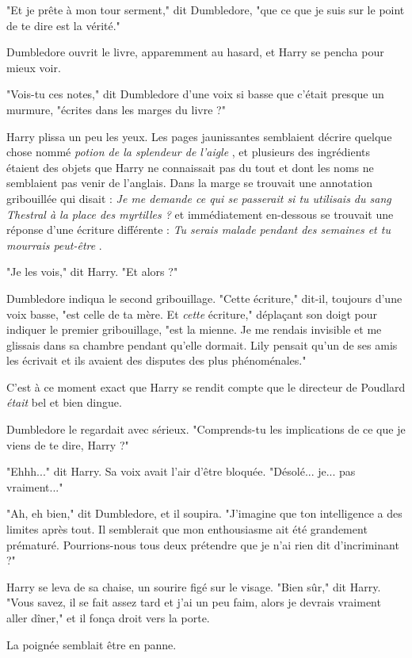 "Et je prête à mon tour serment," dit Dumbledore, "que ce que je suis sur le point de te dire est la vérité."

Dumbledore ouvrit le livre, apparemment au hasard, et Harry se pencha pour mieux voir.

"Vois-tu ces notes," dit Dumbledore d'une voix si basse que c'était presque un murmure, "écrites dans les marges du livre ?"

Harry plissa un peu les yeux. Les pages jaunissantes semblaient décrire quelque chose nommé \emph{potion de la splendeur de l'aigle} , et plusieurs des ingrédients étaient des objets que Harry ne connaissait pas du tout et dont les noms ne semblaient pas venir de l'anglais. Dans la marge se trouvait une annotation gribouillée qui disait : \emph{Je me demande ce qui se passerait si tu utilisais du sang Thestral à la place des myrtilles ?}  et immédiatement en-dessous se trouvait une réponse d'une écriture différente : \emph{Tu serais malade pendant des semaines et tu mourrais peut-être} .

"Je les vois," dit Harry. "Et alors ?"

Dumbledore indiqua le second gribouillage. "Cette écriture," dit-il, toujours d'une voix basse, "est celle de ta mère. Et \emph{cette}  écriture," déplaçant son doigt pour indiquer le premier gribouillage, "est la mienne. Je me rendais invisible et me glissais dans sa chambre pendant qu'elle dormait. Lily pensait qu'un de ses amis les écrivait et ils avaient des disputes des plus phénoménales."

C'est à ce moment exact que Harry se rendit compte que le directeur de Poudlard \emph{était}  bel et bien dingue.

Dumbledore le regardait avec sérieux. "Comprends-tu les implications de ce que je viens de te dire, Harry ?"

"Ehhh..." dit Harry. Sa voix avait l'air d'être bloquée. "Désolé... je... pas vraiment..."

"Ah, eh bien," dit Dumbledore, et il soupira. "J'imagine que ton intelligence a des limites après tout. Il semblerait que mon enthousiasme ait été grandement prématuré. Pourrions-nous tous deux prétendre que je n'ai rien dit d'incriminant ?"

Harry se leva de sa chaise, un sourire figé sur le visage. "Bien sûr," dit Harry. "Vous savez, il se fait assez tard et j'ai un peu faim, alors je devrais vraiment aller dîner," et il fonça droit vers la porte.

La poignée semblait être en panne.

